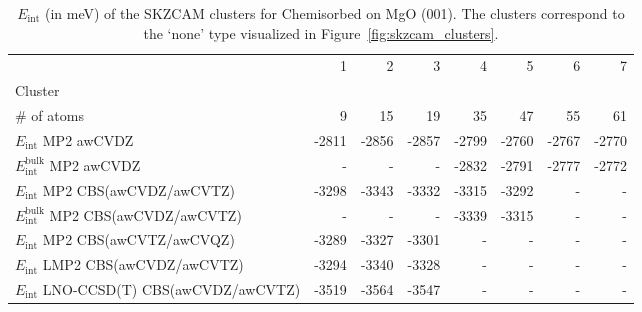 \begin{table}
\caption{\label{tab:system_eint_mgo_co2_chemisorbed}$E_\textrm{int}$ (in meV) of the SKZCAM clusters for Chemisorbed  on MgO (001). The clusters correspond to the `none' type visualized in Figure~\ref{fig:skzcam_clusters}.}
\begin{adjustbox}{center,max width=1.4\textwidth}
\begin{tabular}{lrrrrrrr}
\toprule
 & 1 & 2 & 3 & 4 & 5 & 6 & 7 \\ 
Cluster &  &  &  &  &  &  &  \\
\midrule
\# of atoms & 9 & 15 & 19 & 35 & 47 & 55 & 61 \\
$E_\textrm{int}$ MP2 awCVDZ & -2811 & -2856 & -2857 & -2799 & -2760 & -2767 & -2770 \\
$E_\textrm{int}^\textrm{bulk}$ MP2 awCVDZ & - & - & - & -2832 & -2791 & -2777 & -2772 \\
$E_\textrm{int}$ MP2 CBS(awCVDZ/awCVTZ) & -3298 & -3343 & -3332 & -3315 & -3292 & - & - \\
$E_\textrm{int}^\textrm{bulk}$ MP2 CBS(awCVDZ/awCVTZ) & - & - & - & -3339 & -3315 & - & - \\
$E_\textrm{int}$ MP2 CBS(awCVTZ/awCVQZ) & -3289 & -3327 & -3301 & - & - & - & - \\
$E_\textrm{int}$ LMP2 CBS(awCVDZ/awCVTZ) & -3294 & -3340 & -3328 & - & - & - & - \\
$E_\textrm{int}$ LNO-CCSD(T) CBS(awCVDZ/awCVTZ) & -3519 & -3564 & -3547 & - & - & - & - \\
\bottomrule
\end{tabular}
\end{adjustbox}
\end{table}

